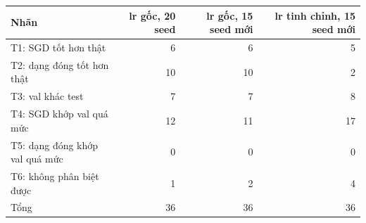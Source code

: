 \begin{tabular}{@{}lrrr@{}}
\toprule
Nhãn & lr gốc, 20 seed & lr gốc, 15 seed mới & lr tinh chỉnh, 15 seed mới \\
\midrule
T1: SGD tốt hơn thật & 6 & 6 & 5 \\
T2: dạng đóng tốt hơn thật & 10 & 10 & 2 \\
T3: val khác test & 7 & 7 & 8 \\
T4: SGD khớp val quá mức & 12 & 11 & 17 \\
T5: dạng đóng khớp val quá mức & 0 & 0 & 0 \\
T6: không phân biệt được & 1 & 2 & 4 \\
\midrule
Tổng & 36 & 36 & 36 \\
\bottomrule
\end{tabular}
